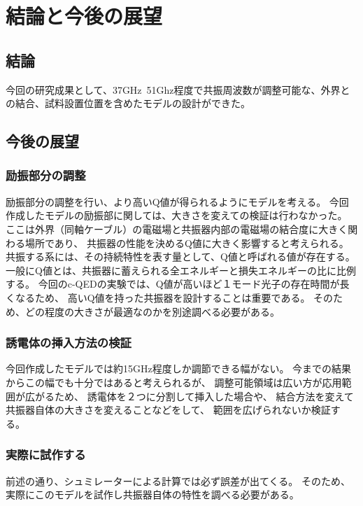 \chapter{結論と今後の展望}
\section{結論}
今回の研究成果として、37GHz~51Ghz程度で共振周波数が調整可能な、外界との結合、試料設置位置を含めたモデルの設計ができた。

\section{今後の展望}

\subsection{励振部分の調整}
励振部分の調整を行い、より高いQ値が得られるようにモデルを考える。
今回作成したモデルの励振部に関しては、大きさを変えての検証は行わなかった。
ここは外界（同軸ケーブル）の電磁場と共振器内部の電磁場の結合度に大きく関わる場所であり、
共振器の性能を決めるQ値に大きく影響すると考えられる。
共振する系には、その持続特性を表す量として、Q値と呼ばれる値が存在する。
一般にQ値とは、共振器に蓄えられる全エネルギーと損失エネルギーの比に比例する。
今回のc-QEDの実験では、Q値が高いほど１モード光子の存在時間が長くなるため、
高いQ値を持った共振器を設計することは重要である。
そのため、どの程度の大きさが最適なのかを別途調べる必要がある。

\subsection{誘電体の挿入方法の検証}
今回作成したモデルでは約15GHz程度しか調節できる幅がない。
今までの結果からこの幅でも十分ではあると考えられるが、
調整可能領域は広い方が応用範囲が広がるため、
誘電体を２つに分割して挿入した場合や、
結合方法を変えて共振器自体の大きさを変えることなどをして、
範囲を広げられないか検証する。

\subsection{実際に試作する}
前述の通り、シュミレーターによる計算では必ず誤差が出てくる。
そのため、実際にこのモデルを試作し共振器自体の特性を調べる必要がある。
